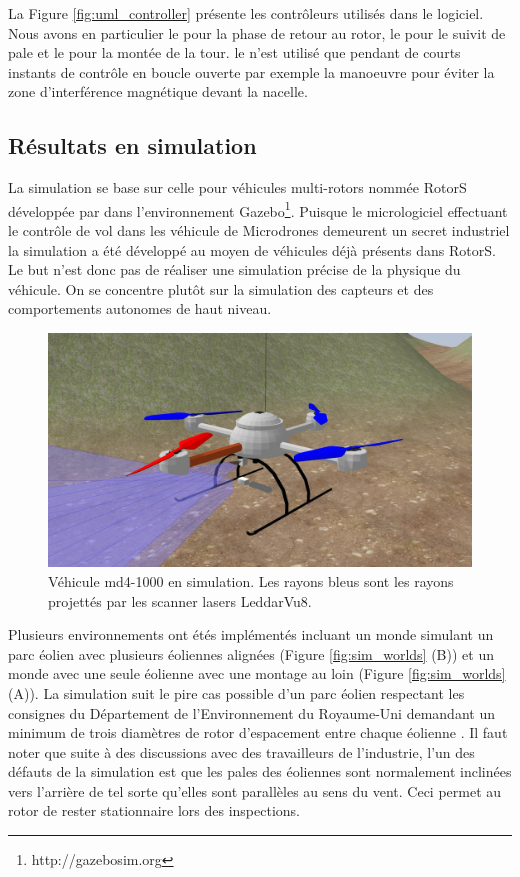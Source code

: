 La Figure \ref{fig:uml_controller} présente les contrôleurs utilisés dans le logiciel. Nous avons en particulier le  pour la phase de retour au rotor, le  pour le suivit de pale et le  pour la montée de la tour. le  n'est utilisé que pendant de courts instants de contrôle en boucle ouverte par exemple la manoeuvre pour éviter la zone d'interférence magnétique devant la nacelle.

\subsection{Résultats en simulation}
\label{subsec:results_simu}
La simulation se base sur celle pour véhicules multi-rotors nommée RotorS développée par \citep{Furrer2016} dans l'environnement Gazebo\footnote{http://gazebosim.org}. Puisque le micrologiciel effectuant le contrôle de vol dans les véhicule de Microdrones demeurent un secret industriel la simulation a été développé au moyen de véhicules déjà présents dans RotorS.
Le but n'est donc pas de réaliser une simulation précise de la physique du véhicule. On se concentre plutôt sur la simulation des capteurs et des comportements autonomes de haut niveau.

\begin{figure}[htp]
  \centering
    \centering
    \includegraphics[width=0.7\linewidth]{images/sim_vehicle_closeup.jpg}
  \caption{Véhicule md4-1000 en simulation. Les rayons bleus sont les rayons projettés par les scanner lasers LeddarVu8.}
  \label{fig:sim_vehicle_closeup}
\end{figure}

Plusieurs environnements ont étés implémentés incluant un monde simulant un parc éolien avec plusieurs éoliennes alignées (Figure \ref{fig:sim_worlds} (B)) et un monde avec une seule éolienne avec une montage au loin (Figure \ref{fig:sim_worlds} (A)). La simulation suit le pire cas possible d'un parc éolien respectant les consignes du Département de l'Environnement du Royaume-Uni demandant un minimum de trois diamètres de rotor d'espacement entre chaque éolienne \citep{DOE2009}. Il faut noter que suite à des discussions avec des travailleurs de l'industrie, l'un des défauts de la simulation est que les pales des éoliennes sont normalement inclinées vers l'arrière de tel sorte qu'elles sont parallèles au sens du vent. Ceci permet au rotor de rester stationnaire lors des inspections.


